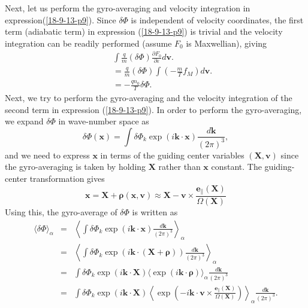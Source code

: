 \documentclass{article}
\newcommand{\tmmathbf}[1]{\ensuremath{\boldsymbol{#1}}}
\begin{document}
Next, let us perform the gyro-averaging and velocity integration in
expression(\ref{18-9-13-p9}). Since $\delta \Phi$ is independent of velocity
coordinates, the first term (adiabatic term) in expression (\ref{18-9-13-p9})
is trivial and the velocity integration can be readily performed (assume $F_0$
is Maxwellian), giving
\begin{eqnarray}
  &  & \int \frac{q}{m} (\delta \Phi) \frac{\partial F_0}{\partial
  \varepsilon} d\mathbf{v}. \nonumber\\
  &  & = \frac{q}{m} (\delta \Phi) \int \left( - \frac{m}{T} f_M \right)
  d\mathbf{v}. \nonumber\\
  &  & = - \frac{q n_0}{T} \delta \Phi .  \label{18-11-27-1}
\end{eqnarray}
Next, we try to perform the gyro-averaging and the velocity integration of the
second term in expression (\ref{18-9-13-p9}). In order to perform the
gyro-averaging, we expand $\delta \Phi$ in wave-number space as
\begin{equation}
  \delta \Phi (\mathbf{x}) = \int \delta \Phi_k \exp (i\mathbf{k} \cdot
  \mathbf{x}) \frac{d\mathbf{k}}{(2 \pi)^3},
\end{equation}
and we need to express $\mathbf{x}$ in terms of the guiding center variables
$(\mathbf{X}, \mathbf{v})$ since the gyro-averaging is taken by holding
$\mathbf{X}$ rather than $\mathbf{x}$ constant. The guiding-center
transformation gives
\begin{equation}
  \mathbf{x}=\mathbf{X}+\tmmathbf{\rho} (\mathbf{x}, \mathbf{v}) \approx
  \mathbf{X}-\mathbf{v} \times \frac{\mathbf{e}_{\parallel}
  (\mathbf{X})}{\Omega (\mathbf{X})}
\end{equation}
Using this, the gyro-average of $\delta \Phi$ is written as
\begin{eqnarray}
  \langle \delta \Phi \rangle_{\alpha} & = & \left\langle \int \delta \Phi_k
  \exp (i\mathbf{k} \cdot \mathbf{x}) \frac{d\mathbf{k}}{(2 \pi)^3}
  \right\rangle_{\alpha} \nonumber\\
  & = & \left\langle \int \delta \Phi_k \exp (i\mathbf{k} \cdot
  (\mathbf{X}+\tmmathbf{\rho})) \frac{d\mathbf{k}}{(2 \pi)^3}
  \right\rangle_{\alpha} \nonumber\\
  & = & \int \delta \Phi_k \exp (i\mathbf{k} \cdot \mathbf{X}) \langle \exp
  (i\mathbf{k} \cdot \tmmathbf{\rho}) \rangle_{\alpha} \frac{d\mathbf{k}}{(2
  \pi)^3} \nonumber\\
  & = & \int \delta \Phi_k \exp (i\mathbf{k} \cdot \mathbf{X}) \left\langle
  \exp \left( - i\mathbf{k} \cdot \mathbf{v} \times
  \frac{\mathbf{e}_{\parallel} (\mathbf{X})}{\Omega (\mathbf{X})} \right)
  \right\rangle_{\alpha} \frac{d\mathbf{k}}{(2 \pi)^3} .  \label{18-9-13-a1}
\end{eqnarray}
\end{document}
